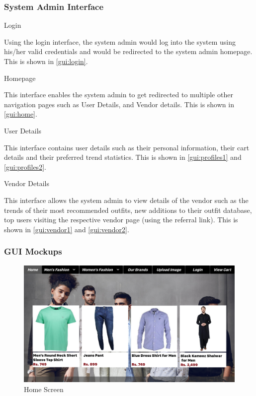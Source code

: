  \subsubsection{System Admin Interface}
 \begin{outline}
   \1 Login
   
   Using the login interface, the system admin would log into the system using his/her valid credentials and would be redirected to the system admin homepage. This is shown in \autoref{gui:login}.
   
   \1 Homepage
   
   This interface enables the system admin to get redirected to multiple other navigation pages such as User Details, and Vendor details. This is shown in \autoref{gui:home}.
   
   \1 User Details
   
   This interface contains user details such as their personal information, their cart details and their preferred trend statistics. This is shown in \autoref{gui:profiles1} and \autoref{gui:profiles2}.
   
   \1 Vendor Details
   
   This interface allows the system admin to view details of the vendor such as the trends of their most recommended outfits, new additions to their outfit database, top users visiting the respective vendor page (using the referral link). This is shown in \autoref{gui:vendor1} and \autoref{gui:vendor2}.
 \end{outline}

\subsubsection{GUI Mockups}
\begin{figure}[H]
\includegraphics[width=15cm]{images/HomeScreen.pdf} 
\centering
\caption{Home Screen}
\label{gui:home}
\end{figure}

